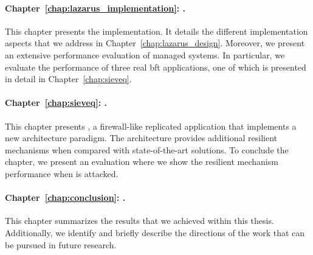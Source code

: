 \paragraph{Chapter~\ref{chap:lazarus_implementation}: .}
This chapter presents the \system implementation. 
It details the different implementation aspects that we address in Chapter~\ref{chap:lazarus_design}. 
Moreover, we present an extensive performance evaluation of \system managed systems.
In particular, we evaluate the performance of three real \gls{bft} applications, one of which is presented in detail in Chapter~\ref{chap:sieveq}.

\paragraph{Chapter~\ref{chap:sieveq}: .}
This chapter presents \sieveq, a firewall-like replicated application that implements a new architecture paradigm.
The \sieveq architecture provides additional resilient mechanisms when compared with state-of-the-art solutions.
To conclude the chapter, we present an evaluation where we show the resilient mechanism performance when \sieveq is attacked.



\paragraph{Chapter~\ref{chap:conclusion}: .}
This chapter summarizes the results that we achieved within this thesis.
Additionally, we identify and briefly describe the directions of the work that can be pursued in future research.   

